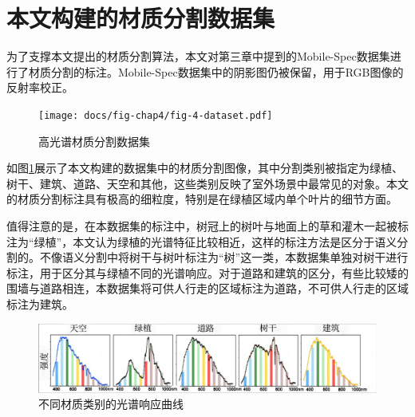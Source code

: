 \documentclass[
    type = master, %
    degree = academic,        %
    decl-page,  %
  ]{njuthesis}
\begin{document}

\section{本文构建的材质分割数据集}
为了支撑本文提出的材质分割算法，本文对第三章中提到的Mobile-Spec数据集进行了材质分割的标注。Mobile-Spec数据集中的阴影图仍被保留，用于RGB图像的反射率校正。
\begin{figure}[h]
	\centering
	\texttt{[image: docs/fig-chap4/fig-4-dataset.pdf]}
	\caption{高光谱材质分割数据集}
	\label{fig:seg dataset}
\end{figure}

如图\ref{fig:seg dataset}展示了本文构建的数据集中的材质分割图像，其中分割类别被指定为绿植、树干、建筑、道路、天空和其他，这些类别反映了室外场景中最常见的对象。本文的材质分割标注具有极高的细粒度，特别是在绿植区域内单个叶片的细节方面。

值得注意的是，在本数据集的标注中，树冠上的树叶与地面上的草和灌木一起被标注为“绿植”，本文认为绿植的光谱特征比较相近，这样的标注方法是区分于语义分割的。不像语义分割中将树干与树叶标注为“树”这一类，本数据集单独对树干进行标注，用于区分其与绿植不同的光谱响应。对于道路和建筑的区分，有些比较矮的围墙与道路相连，本数据集将可供人行走的区域标注为道路，不可供人行走的区域标注为建筑。

\begin{figure}[h]
	\centering
	\includegraphics[width=1.0\linewidth]{docs/fig-chap4/fig-4-curve.pdf}
	\caption{不同材质类别的光谱响应曲线}
	\label{fig:seg curve}
\end{figure}
\end{document}
